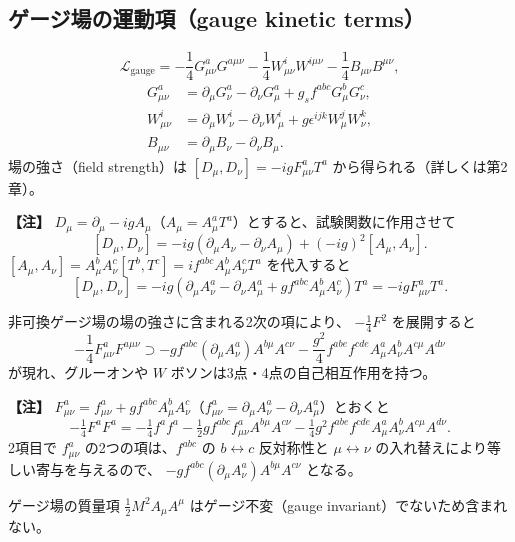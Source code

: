 \documentclass[uplatex,dvipdfmx,a4paper,11pt,openany]{jsbook}
\newcommand{\en}[1]{（#1）}
\newenvironment{note}{\vspace{1ex}\par\footnotesize\noindent\textbf{【注】}}{\par\vspace{1ex}}
\numberwithin{equation}{chapter}
\theoremstyle{definition}
\theoremstyle{plain}
\theoremstyle{remark}
\newcommand{\Lag}{\mathcal{L}}
\begin{document}
\subsection{ゲージ場の運動項（gauge kinetic terms）}
\begin{equation}
\Lag_{\mathrm{gauge}}
=
-\frac14G_{\mu\nu}^aG^{a\mu\nu}
-\frac14W_{\mu\nu}^iW^{i\mu\nu}
-\frac14B_{\mu\nu}B^{\mu\nu},
\end{equation}
\begin{align}
G_{\mu\nu}^a&=\partial_\mu G_\nu^a-\partial_\nu G_\mu^a+g_sf^{abc}G_\mu^bG_\nu^c,\\
W_{\mu\nu}^i&=\partial_\mu W_\nu^i-\partial_\nu W_\mu^i+g\epsilon^{ijk}W_\mu^jW_\nu^k,\\
B_{\mu\nu}&=\partial_\mu B_\nu-\partial_\nu B_\mu .
\end{align}
場の強さ\en{field strength}は $[D_\mu,D_\nu]=-igF_{\mu\nu}^aT^a$ から得られる（詳しくは第2章）。
\begin{note}
$D_\mu=\partial_\mu-igA_\mu$（$A_\mu=A_\mu^aT^a$）とすると、試験関数に作用させて
\[
[D_\mu,D_\nu]
=-ig(\partial_\mu A_\nu-\partial_\nu A_\mu)+(-ig)^2[A_\mu,A_\nu].
\]
$[A_\mu,A_\nu]=A_\mu^bA_\nu^c[T^b,T^c]=if^{abc}A_\mu^bA_\nu^cT^a$ を代入すると
\[
[D_\mu,D_\nu]=-ig\left(\partial_\mu A_\nu^a-\partial_\nu A_\mu^a+gf^{abc}A_\mu^bA_\nu^c\right)T^a
=-igF^a_{\mu\nu}T^a .
\]
\end{note}
非可換ゲージ場の場の強さに含まれる2次の項により、
$-\frac14F^2$ を展開すると
\begin{equation}
-\frac14F^a_{\mu\nu}F^{a\mu\nu}
\supset
-gf^{abc}(\partial_\mu A_\nu^a)A^{b\mu}A^{c\nu}
-\frac{g^2}{4}f^{abe}f^{cde}A_\mu^aA_\nu^bA^{c\mu}A^{d\nu}
\end{equation}
が現れ、グルーオンや $W$ ボソンは3点・4点の自己相互作用を持つ。
\begin{note}
$F^a_{\mu\nu}=f^a_{\mu\nu}+gf^{abc}A^b_\mu A^c_\nu$（$f^a_{\mu\nu}=\partial_\mu A_\nu^a-\partial_\nu A_\mu^a$）とおくと
\[
-\tfrac14F^aF^a
=-\tfrac14f^af^a
-\tfrac12gf^{abc}f^a_{\mu\nu}A^{b\mu}A^{c\nu}
-\tfrac14g^2f^{abe}f^{cde}A^a_\mu A^b_\nu A^{c\mu}A^{d\nu}.
\]
2項目で $f^a_{\mu\nu}$ の2つの項は、$f^{abc}$ の $b\leftrightarrow c$ 反対称性と $\mu\leftrightarrow\nu$ の入れ替えにより等しい寄与を与えるので、
$-gf^{abc}(\partial_\mu A^a_\nu)A^{b\mu}A^{c\nu}$ となる。
\end{note}
ゲージ場の質量項 $\frac12M^2A_\mu A^\mu$ はゲージ不変\en{gauge invariant}でないため含まれない。
\end{document}
